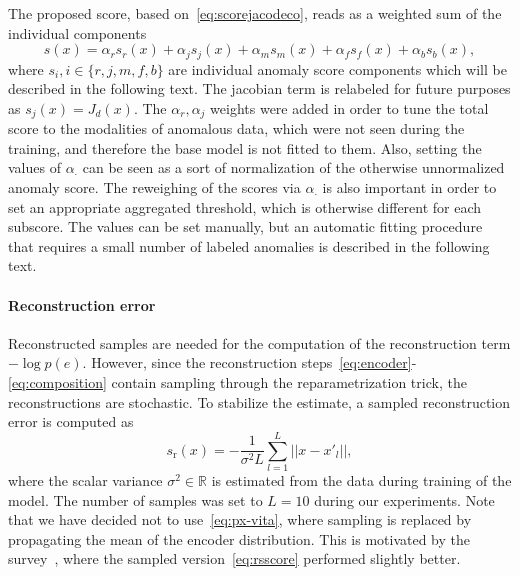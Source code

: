 The proposed score, based on~\eqref{eq:scorejacodeco}, reads as a weighted sum of the individual components
\begin{equation} \label{eq:totalscorejacobian}
    s(x) = \alpha_{r}  s_{r}(x) + \alpha_j s_j(x) + \alpha_m s_{m}(x) + \alpha_f s_{f}(x) + \alpha_b s_{b}(x),
\end{equation}
where $s_i, i \in \{r, j, m, f, b\}$ are individual anomaly score components which will be described in the following text. The jacobian term is relabeled for future purposes as $s_j(x)=J_d(x)$.  The $\alpha_r, \alpha_j$ weights were added in order to tune the total score to the modalities of anomalous data, which were not seen during the training, and therefore the base model is not fitted to them. Also, setting the values of $\alpha_\cdot$ can be seen as a sort of normalization of the otherwise unnormalized anomaly score. The reweighing of the scores via $\alpha_\cdot$ is also important in order to set an appropriate aggregated threshold, which is otherwise different for each subscore. The values can be set manually, but an automatic fitting procedure that requires a small number of labeled anomalies is described in the following text.

\paragraph{Reconstruction error}
Reconstructed samples are needed for the computation of the reconstruction term $-\log p(e)$. However, since the reconstruction steps~\eqref{eq:encoder}-\eqref{eq:composition} contain sampling through the reparametrization trick, the reconstructions are stochastic. To stabilize the estimate, a sampled reconstruction error is computed as
\begin{equation} \label{eq:rsscore}
    s_{\text{r}}(x) = - \frac{1}{\sigma^2 L}\sum_{l=1}^L \vert \vert x-x'_l\vert \vert,
\end{equation}
where the scalar variance $\sigma^2 \in \mathbb{R}$ is estimated from the data during training of the model. The number of samples was set to $L=10$ during our experiments. Note that we have decided not to use~\eqref{eq:px-vita}, where sampling is replaced by propagating the mean of the encoder distribution. This is motivated by the survey~\cite{vskvara2021comparison}, where the sampled version~\eqref{eq:rsscore} performed slightly better.

